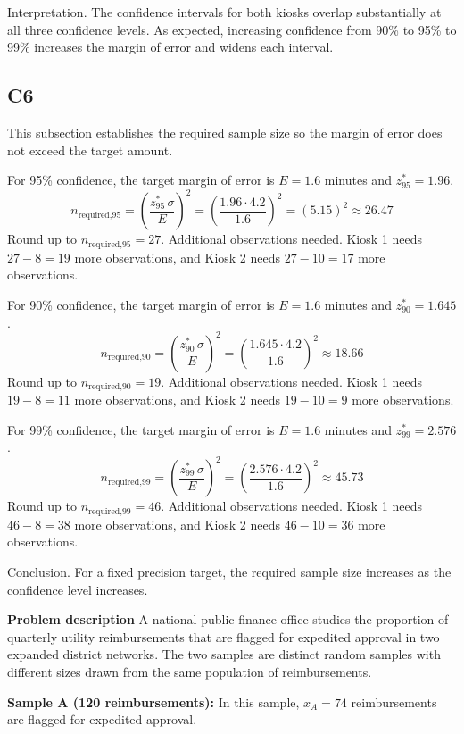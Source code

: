 \begin{ExamProblems}
		Interpretation.
		The confidence intervals for both kiosks overlap substantially at all three confidence levels.
		As expected, increasing confidence from 90\% to 95\% to 99\% increases the margin of error and widens each interval.
		
		\subsection*{C6}
		This subsection establishes the required sample size so the margin of error does not exceed the target amount.
		
		For 95\% confidence, the target margin of error is $E = 1.6$ minutes and $z^*_{95} = 1.96$.
		\[
		n_{\text{required,95}} = \left(\frac{z^*_{95}\,\sigma}{E}\right)^2
		= \left(\frac{1.96 \cdot 4.2}{1.6}\right)^2
		= \left(5.15\right)^2
		\approx 26.47
		\]
		Round up to $n_{\text{required,95}} = 27$.
		Additional observations needed.
		Kiosk 1 needs $27 - 8 = 19$ more observations, and Kiosk 2 needs $27 - 10 = 17$ more observations.
		
		For 90\% confidence, the target margin of error is $E = 1.6$ minutes and $z^*_{90} = 1.645$.
		\[
		n_{\text{required,90}} = \left(\frac{z^*_{90}\,\sigma}{E}\right)^2
		= \left(\frac{1.645 \cdot 4.2}{1.6}\right)^2
		\approx 18.66
		\]
		Round up to $n_{\text{required,90}} = 19$.
		Additional observations needed.
		Kiosk 1 needs $19 - 8 = 11$ more observations, and Kiosk 2 needs $19 - 10 = 9$ more observations.
		
		For 99\% confidence, the target margin of error is $E = 1.6$ minutes and $z^*_{99} = 2.576$.
		\[
		n_{\text{required,99}} = \left(\frac{z^*_{99}\,\sigma}{E}\right)^2
		= \left(\frac{2.576 \cdot 4.2}{1.6}\right)^2
		\approx 45.73
		\]
		Round up to $n_{\text{required,99}} = 46$.
		Additional observations needed.
		Kiosk 1 needs $46 - 8 = 38$ more observations, and Kiosk 2 needs $46 - 10 = 36$ more observations.
		
		Conclusion.
		For a fixed precision target, the required sample size increases as the confidence level increases.

		\newpage
		\item
		\textbf{Problem description}
		A national public finance office studies the proportion of quarterly utility reimbursements that are flagged for expedited approval in two expanded district networks.
		The two samples are distinct random samples with different sizes drawn from the same population of reimbursements.
		
		\textbf{Sample A (120 reimbursements):}
		In this sample, $x_A = 74$ reimbursements are flagged for expedited approval.
		

\end{ExamProblems}
